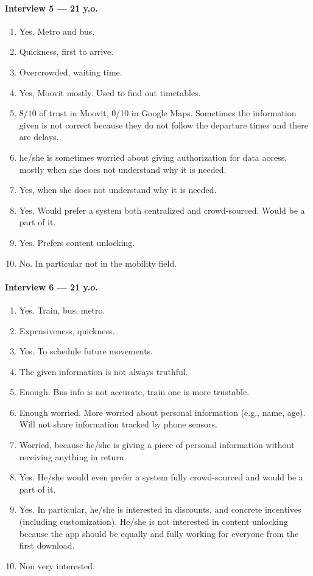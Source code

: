 \documentclass[a4paper, 11pt, twocolumn]{article}
\begin{document}
\paragraph*{Interview 5 --- 21 y.o.}
\begin{enumerate}
    \item Yes. Metro and bus.
    \item Quickness, first to arrive.
    \item Overcrowded, waiting time.
    \item Yes, Moovit mostly. Used to find out timetables.
    \item $8/10$ of trust in Moovit, 0/10 in Google Maps. Sometimes the information given is not correct because they do not follow the departure times and there are delays.
    \item he/she is sometimes worried about giving authorization for data access, mostly when she does not understand why it is needed.
    \item Yes, when she does not understand why it is needed.
    \item Yes. Would prefer a system both centralized and crowd-sourced. Would be a part of it.
    \item Yes. Prefers content unlocking.
    \item No. In particular not in the mobility field.
\end{enumerate}


\paragraph*{Interview 6 --- 21 y.o.}
\begin{enumerate}
    \item Yes. Train, bus, metro.
    \item Expensiveness, quickness.
    \item Yes. To schedule future movements.
    \item The given information is not always truthful.
    \item Enough. Bus info is not accurate, train one is more trustable.
    \item Enough worried. More worried about personal information (e.g., name, age). Will not share information tracked by phone sensors.
    \item Worried, because he/she is giving a piece of personal information without receiving anything in return.
    \item Yes. He/she would even prefer a system fully crowd-sourced and would be a part of it.
    \item Yes. In particular, he/she is interested in discounts, and concrete incentives (including customization). He/she is not interested in content unlocking because the app should be equally and fully working for everyone from the first download.
    \item Non very interested.
\end{enumerate}
\end{document}
